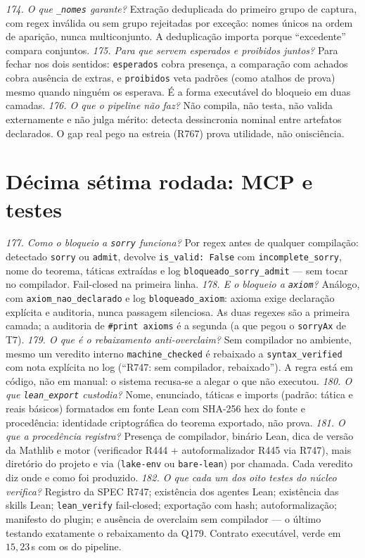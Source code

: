 \textit{174. O que \texttt{\_nomes} garante?} Extração deduplicada do primeiro grupo de captura, com regex inválida ou sem grupo rejeitadas por exceção: nomes únicos na ordem de aparição, nunca multiconjunto. A deduplicação importa porque ``excedente'' compara conjuntos.
\textit{175. Para que servem esperados e proibidos juntos?} Para fechar nos dois sentidos: \texttt{esperados} cobra presença, a comparação com achados cobra ausência de extras, e \texttt{proibidos} veta padrões (como atalhos de prova) mesmo quando ninguém os esperava. É a forma executável do bloqueio em duas camadas.
\textit{176. O que o pipeline não faz?} Não compila, não testa, não valida externamente e não julga mérito: detecta dessincronia nominal entre artefatos declarados. O gap real pego na estreia (R767) prova utilidade, não onisciência.
\section{Décima sétima rodada: MCP e testes}
\textit{177. Como o bloqueio a \texttt{sorry} funciona?} Por regex antes de qualquer compilação: detectado \texttt{sorry} ou \texttt{admit}, devolve \texttt{is\_valid: False} com \texttt{incomplete\_sorry}, nome do teorema, táticas extraídas e log \texttt{bloqueado\_sorry\_admit} --- sem tocar no compilador. Fail-closed na primeira linha.
\textit{178. E o bloqueio a \texttt{axiom}?} Análogo, com \texttt{axiom\_nao\_declarado} e log \texttt{bloqueado\_axiom}: axioma exige declaração explícita e auditoria, nunca passagem silenciosa. As duas regexes são a primeira camada; a auditoria de \texttt{\#print axioms} é a segunda (a que pegou o \texttt{sorryAx} de T7).
\textit{179. O que é o rebaixamento anti-overclaim?} Sem compilador no ambiente, mesmo um veredito interno \texttt{machine\_checked} é rebaixado a \texttt{syntax\_verified} com nota explícita no log (``R747: sem compilador, rebaixado''). A regra está em código, não em manual: o sistema recusa-se a alegar o que não executou.
\textit{180. O que \texttt{lean\_export} custodia?} Nome, enunciado, táticas e imports (padrão: tática e reais básicos) formatados em fonte Lean com SHA-256 hex do fonte e procedência: identidade criptográfica do teorema exportado, não prova.
\textit{181. O que a procedência registra?} Presença de compilador, binário Lean, dica de versão da Mathlib e motor (verificador R444 + autoformalizador R445 via R747), mais diretório do projeto e via (\texttt{lake-env} ou \texttt{bare-lean}) por chamada. Cada veredito diz onde e como foi produzido.
\textit{182. O que cada um dos oito testes do núcleo verifica?} Registro da SPEC R747; existência dos agentes Lean; existência das skills Lean; \texttt{lean\_verify} fail-closed; exportação com hash; autoformalização; manifesto do plugin; e ausência de overclaim sem compilador --- o último testando exatamente o rebaixamento da Q179. Contrato executável, verde em $15{,}23$\,s com os do pipeline.
